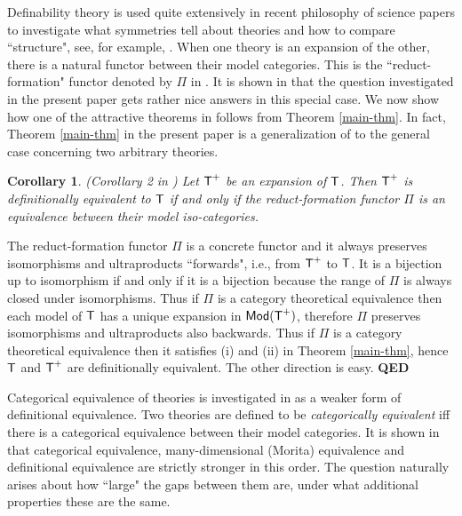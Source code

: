 \documentclass[12pt,leqno]{article}
\newcommand{\T}{\mbox{\sf T}}
\newcommand{\Mod}{\mbox{\sf Mod}}
\newcommand{\qed}{\hfill\mbox{\bf QED}\bigskip}
\newtheorem{cor}{Corollary}
\begin{document}
Definability theory is used quite extensively in recent philosophy of science papers to investigate what symmetries tell about theories and how to compare ``structure", see, for example, \cite{Bsym, BMW, Halvorson, HudetzDCE}. When one theory is an expansion of the other, there is a natural functor between their model categories. This is the ``reduct-formation" functor denoted by $\Pi$ in \cite[above Example 9]{Bsym}. It is shown in \cite{Bsym} that the question investigated in the present paper gets rather nice answers in this special case. We now show how one of the attractive theorems in \cite{Bsym} follows from Theorem \ref{main-thm}. In fact, Theorem \ref{main-thm} in the present paper is a generalization of \cite[Corollary 2]{Bsym} to the general case concerning two arbitrary theories.

\begin{cor}\label{cor1}(Corollary 2 in \cite{Bsym})
Let $\T^{+}$ be an expansion of $\T$. Then $\T^{+}$ is definitionally equivalent to $\T$ if and only if the reduct-formation functor $\Pi$ is an equivalence between their model iso-categories.
\end{cor}

The reduct-formation functor $\Pi$ is a concrete functor and it always preserves isomorphisms and ultraproducts ``forwards", i.e., from $\T^{+}$ to $\T$. It is a bijection up to isomorphism if and only if it is a bijection because the range of $\Pi$ is always closed under isomorphisms. Thus if $\Pi$ is a category theoretical equivalence then each model of $\T$ has a unique expansion in $\Mod(\T^{+})$, therefore $\Pi$ preserves isomorphisms and ultraproducts also backwards. Thus if $\Pi$ is a category theoretical equivalence then it satisfies (i) and (ii) in Theorem \ref{main-thm}, hence $\T$ and $\T^+$ are definitionally equivalent. The other direction is easy. %
	\qed\bigskip

Categorical equivalence of theories is investigated in \cite{BH16} as a weaker form of definitional equivalence. Two theories are defined to be \emph{categorically equivalent} iff there is a categorical equivalence between their model categories. It is shown in \cite{BH16} that categorical equivalence, many-dimensional (Morita) equivalence and definitional equivalence are strictly stronger in this order. The question naturally arises about how ``large" the gaps between them are, under what additional properties these are the same. 
\end{document}
